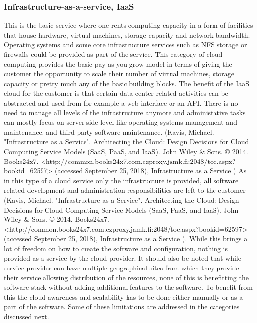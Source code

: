 \documentclass{article}
\begin{document}
\subsubsection{Infrastructure-as-a-service, IaaS}
This is the basic service where one rents computing capacity in a form of facilities that house hardware, virtual machines, storage capacity and network bandwidth.
Operating systems and some core infrastructure services such as NFS storage or firewalls could be provided as part of the service. This category of cloud computing provides the basic pay-as-you-grow model in terms of giving the customer the opportunity to scale their number of virtual machines, storage capacity or pretty much any of the basic building blocks.
The benefit of the IaaS cloud for the customer is that certain data center related activities can be abstracted and used from for example a web interface or an API. There is no need to manage all levels of the infrastructure anymore and administative tasks can mostly focus on server side level like operating systems management and maintenance, and third party software maintenance. (Kavis, Michael. "Infrastructure as a Service". Architecting the Cloud: Design Decisions for Cloud Computing Service Models (SaaS, PaaS, and IaaS). John Wiley & Sons. © 2014. Books24x7. <http://common.books24x7.com.ezproxy.jamk.fi:2048/toc.aspx?bookid=62597> (accessed September 25, 2018), Infrastructure as a Service )
As in this type of a cloud service only the infrastructure is provided, all software related development and administration responsibilities are left to the customer (Kavis, Michael. "Infrastructure as a Service". Architecting the Cloud: Design Decisions for Cloud Computing Service Models (SaaS, PaaS, and IaaS). John Wiley & Sons. © 2014. Books24x7. <http://common.books24x7.com.ezproxy.jamk.fi:2048/toc.aspx?bookid=62597> (accessed September 25, 2018), Infrastructure as a Service ). While this brings a lot of freedom on how to create the software and configuration, nothing is provided as a service by the cloud provider.
It should also be noted that while service provider can have multiple geographical sites from which they provide their service allowing distribution of the resources, none of this is benefitting the software stack without adding additional features to the software. To benefit from this the cloud awareness and scalability has to be done either manually or as a part of the software. Some of these limitations are addressed in the categories discussed next.
\end{document}
